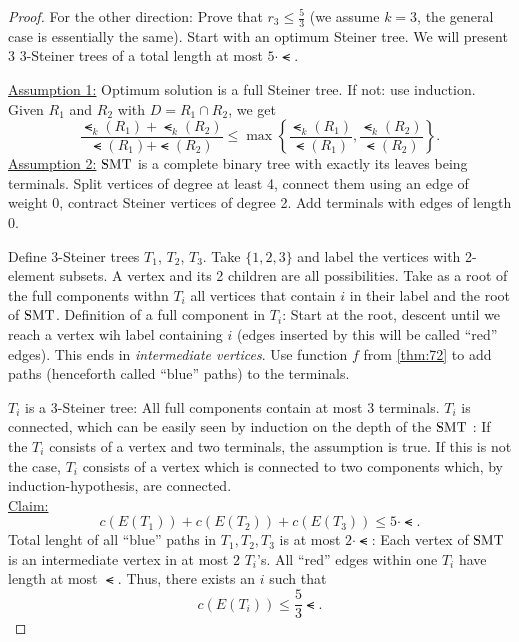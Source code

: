 \documentclass[../skript.tex]{subfiles}
\begin{document}
\begin{proof}
For the other direction: Prove that $r_3 \leq \frac{5}{3}$ (we assume $k = 3$, the general case is essentially the same).
Start with an optimum Steiner tree. We will present 3 3-Steiner trees of a total length at most $5 \cdot \smt$.

\underline{Assumption 1:} Optimum solution is a full Steiner tree. If not: use induction.
Given $R_1$ and $R_2$ with $D = R_1 \cap R_2$, we get
\[
\frac{\smt_k(R_1) + \smt_k(R_2)}{\smt(R_1) + \smt(R_2)} \leq \max \left\{ \frac{\smt_k(R_1)}{\smt(R_1)}, \frac{\smt_k(R_2)}{\smt(R_2)} \right\}.
\]
\underline{Assumption 2:} $\operatorname{SMT}$ is a complete binary tree with exactly its leaves being terminals.
Split vertices of degree at least 4, connect them using an edge of weight 0, contract Steiner vertices of degree 2. Add terminals with edges of length 0.

Define 3-Steiner trees $T_1$, $T_2$, $T_3$. Take $\{ 1, 2, 3 \}$ and label the vertices with 2-element subsets. A vertex and its 2 children are all possibilities.
Take as a root of the full components withn $T_i$ all vertices that contain $i$ in their label and the root of $\operatorname{SMT}$.
Definition of a full component in $T_i$: Start at the root, descent until we reach a vertex wih label containing $i$ (edges inserted by this will be called ``red'' edges). This ends in \emph{intermediate vertices}. Use function $f$ from \cref{thm:72} to add paths (henceforth called ``blue'' paths) to the terminals.

$T_i$ is a 3-Steiner tree: All full components contain at most $3$ terminals. \checkmark
$T_i$ is connected, which can be easily seen by induction on the depth of the $\operatorname{SMT}$ : If the $T_i$ consists of a vertex and two terminals, the assumption is true.
If this is not the case, $T_i$ consists of a vertex which is connected to two components which, by induction-hypothesis, are connected. \\
\underline{Claim:}
\[
c(E(T_1)) + c(E(T_2)) + c(E(T_3)) \leq 5 \cdot \smt.
\]
Total lenght of all ``blue'' paths in $T_1, T_2, T_3$ is at most $2 \cdot \smt$: Each vertex of $\operatorname{SMT}$ is an intermediate vertex in at most $2$ $T_i$'s.
All ``red'' edges within one $T_i$ have length at most $\smt$.
Thus, there exists an $i$ such that
\[
	c(E(T_i)) \leq \frac{5}{3} \smt.
\] 
\end{proof}
\end{document}
